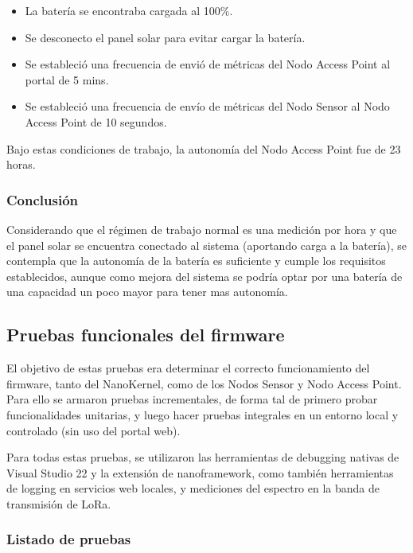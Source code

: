 \begin{itemize}
    \item La batería se encontraba cargada al 100\%.
    \item Se desconecto el panel solar para evitar cargar la batería.
    \item Se estableció una frecuencia de envió de métricas del Nodo Access Point al portal de 5 mins.
    \item Se estableció una frecuencia de envío de métricas del Nodo Sensor al Nodo Access Point de 10 segundos.
\end{itemize}
Bajo estas condiciones de trabajo, la autonomía del Nodo Access Point fue de 23 horas.

\subsubsection{Conclusión}
Considerando que el régimen de trabajo normal es una medición por hora y que el panel solar se encuentra conectado al sistema (aportando carga a la batería), se contempla que la autonomía de la batería es suficiente y cumple los requisitos establecidos, aunque como mejora del sistema se podría optar por una batería de una capacidad un poco mayor para tener mas autonomía. 
\subsection{Pruebas funcionales del firmware}
\label{sec:pruebasFW}

El objetivo de estas pruebas era determinar el correcto funcionamiento del firmware, tanto del NanoKernel, como de los Nodos Sensor y Nodo Access Point. 
Para ello se armaron pruebas incrementales, de forma tal de primero probar funcionalidades unitarias, y luego hacer pruebas integrales en un entorno local y controlado (sin uso del portal web).

Para todas estas pruebas, se utilizaron las herramientas de debugging nativas de Visual Studio 22 y la extensión de nanoframework, como también herramientas de logging en servicios web locales, y mediciones del espectro en la banda de transmisión de LoRa.

\subsubsection{Listado de pruebas}

